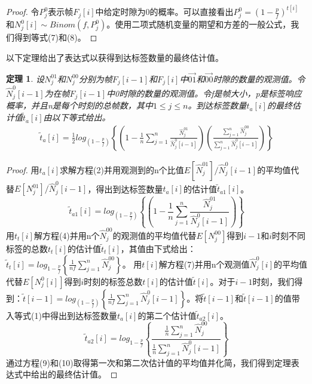 \documentclass[UTF8]{ctexart}
\newtheorem{theorem}{定理}
\newtheorem*{proof}{证明}
\begin{document}
	\begin{proof}
		令$P^0_j$表示帧$F_j[i]$中给定时隙为0的概率。可以直接看出$P^0_j=\left(1-\frac{p}{f}\right)^{t[i]}$和$N^0_j[i]\sim Binom\left(f,P^0_j\right)$。使用二项式随机变量的期望和方差的一般公式，我们得到等式(7)和(8)。
	\end{proof}
	
	以下定理给出了表达式以获得到达标签数量的最终估计值。
	
	\begin{theorem}
		设$N^{01}_j$和$N^{00}_j$分别为帧$F_j[i-1]$和$F_j[i]$中$\overrightarrow{01}$和$\overrightarrow{00}$时隙的数量的观测值。令$\hat{N}^0_j[i-1]$为在帧$F_j[i-1]$中0时隙的数量的观测值。令f是帧大小，p是标签响应概率，并且n是每个时刻的总帧数，其中$1\leq j\leq n$。到达标签数量$t_a[i]$的最终估计值$\widetilde{t}_a[i]$由以下等式给出。
		\begin{eqnarray*}
			\widetilde{t}_a[i]=\frac{1}{2}log_{\left(1-\frac{p}{f}\right)}\left\{\left(1-\frac{1}{n}\sum_{j=1}^{n}\frac{\hat{N}^{01}_j}{\hat{N}^0_j\left[i-1\right]}\right)\left(\frac{\sum_{j=1}^{n}\hat{N}^{00}_j}{\sum_{j=1}^{n}\hat{N}^0_j\left[i-1\right]}\right)\right\}
		\end{eqnarray*}
	\end{theorem}
	
	\begin{proof}
		用$t_a[i]$求解方程(2)并用观测到的n个比值$E[\hat{N}^{01}_j]/\hat{N}^0_j[i-1]$的平均值代替$E[N^{01}_j]/\hat{N}^0_j[i-1]$，得出到达标签数量$t_a[i]$的估计值$\widetilde{t}_{a1}[i]$。
		\begin{equation}
		\widetilde{t}_{a1}[i]=log_{\left(1-\frac{p}{f}\right)}\left\{\left(1-\frac{1}{n}\sum_{j=1}^{n}\frac{\hat{N}^{01}_j}{\hat{N}^0_j\left[i-1\right]}\right)\right\}
		\end{equation}
		用$t_t[i]$解方程(4)并用n个$\hat{N}^{00}_j$的观测值的平均值代替$E[N^{00}_j]$得到$i-1$和$i$时刻不同标签的总数$t_t[i]$的估计值$\widetilde{t}_t[i]$，其值由下式给出：\\$\widetilde{t}_t[i]=log_{1-\frac{p}{f}}\left\{\frac{1}{nf}\sum_{j=1}^{n}\hat{N}^{00}_j\right\}$。 用$t[i]$解方程(7)并用n个观测值$\hat{N}^0_j[i]$的平均值代替$E[N^0_j[i]]$得到$i$时刻的标签总数$t[i]$的估计值$\widetilde{t}[i]$。对于$i-1$时刻，我们得到：$\widetilde{t}[i-1]=log_{(1-\frac{p}{f})}\left\{\frac{1}{nf}\sum_{j=1}^{n}\hat{N}^0_j\left[i-1\right]\right\}$。将$\widetilde{t}[i-1]$和$\widetilde{t}[i-1]$的值带入等式(1)中得出到达标签数量$t_a[i]$的第二个估计值$\widetilde{t}_{a2}[i]$。
		\begin{equation}
		\widetilde{t}_{a2}[i]=log_{1-\frac{p}{f}}\left\{\frac{\frac{1}{n}\sum_{j=1}^{n}\hat{N}^{00}_j}{\frac{1}{n}\sum_{j=1}^{n}\hat{N}^0_j[i-1]}\right\}
		\end{equation}
		通过方程(9)和(10)取得第一次和第二次估计值的平均值并化简，我们得到定理表达式中给出的最终估计值。
	\end{proof}
	
\end{document}
